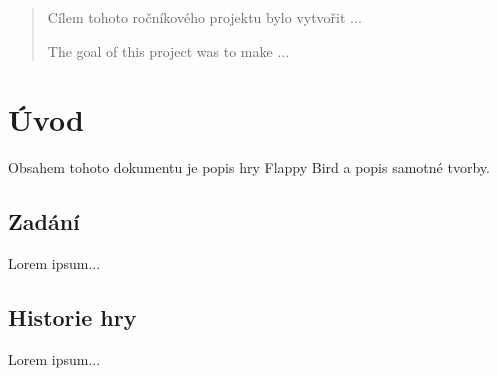 \begin{abstract}
    Cílem tohoto ročníkového projektu bylo vytvořit ...
    
    \hspace{}
    
    \hspace{}
    
    The goal of this project was to make ...
    
\end{abstract}

\section{Úvod}

Obsahem tohoto dokumentu je popis hry Flappy Bird a popis samotné tvorby.

\subsection{Zadání}

Lorem ipsum...

\subsection{Historie hry}
Lorem ipsum...